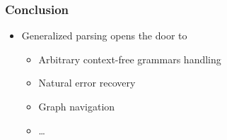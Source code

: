 \documentclass[xcolor=table,aspectratio=169]{beamer}
\begin{document}
\begin{frame}[fragile]
  \frametitle{Conclusion}  
  \begin{itemize}
    \item Generalized parsing opens the door to
    \begin{itemize}
      \item Arbitrary context-free grammars handling
      \item Natural error recovery
      \item Graph navigation
      \item \ldots
    \end{itemize} 
  \end{itemize}
\end{frame}
\end{document}
